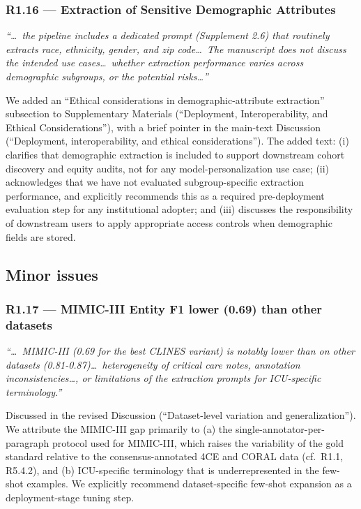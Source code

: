 \documentclass[11pt,letterpaper]{article}
\newcommand{\reviewer}[1]{\par\medskip\textcolor{blue!75!black}{\textit{#1}}\par\medskip}
\newcommand{\response}[1]{\par#1\par\medskip}
\begin{document}
\subsubsection*{R1.16 --- Extraction of Sensitive Demographic Attributes}
\reviewer{``\dots\ the pipeline includes a dedicated prompt (Supplement 2.6) that routinely extracts race, ethnicity, gender, and zip code\dots\ The manuscript does not discuss the intended use cases\dots\ whether extraction performance varies across demographic subgroups, or the potential risks\dots''}
\response{We added an ``Ethical considerations in demographic-attribute extraction'' subsection to Supplementary Materials (``Deployment, Interoperability, and Ethical Considerations''), with a brief pointer in the main-text Discussion (``Deployment, interoperability, and ethical considerations''). The added text: (i) clarifies that demographic extraction is included to support downstream cohort discovery and equity audits, not for any model-personalization use case; (ii) acknowledges that we have not evaluated subgroup-specific extraction performance, and explicitly recommends this as a required pre-deployment evaluation step for any institutional adopter; and (iii) discusses the responsibility of downstream users to apply appropriate access controls when demographic fields are stored.}

\subsection*{Minor issues}

\subsubsection*{R1.17 --- MIMIC-III Entity F1 lower (0.69) than other datasets}
\reviewer{``\dots\ MIMIC-III (0.69 for the best CLINES variant) is notably lower than on other datasets (0.81-0.87)\dots\ heterogeneity of critical care notes, annotation inconsistencies\dots, or limitations of the extraction prompts for ICU-specific terminology.''}
\response{Discussed in the revised Discussion (``Dataset-level variation and generalization''). We attribute the MIMIC-III gap primarily to (a) the single-annotator-per-paragraph protocol used for MIMIC-III, which raises the variability of the gold standard relative to the consensus-annotated 4CE and CORAL data (cf.\ R1.1, R5.4.2), and (b) ICU-specific terminology that is underrepresented in the few-shot examples. We explicitly recommend dataset-specific few-shot expansion as a deployment-stage tuning step.}
\end{document}

